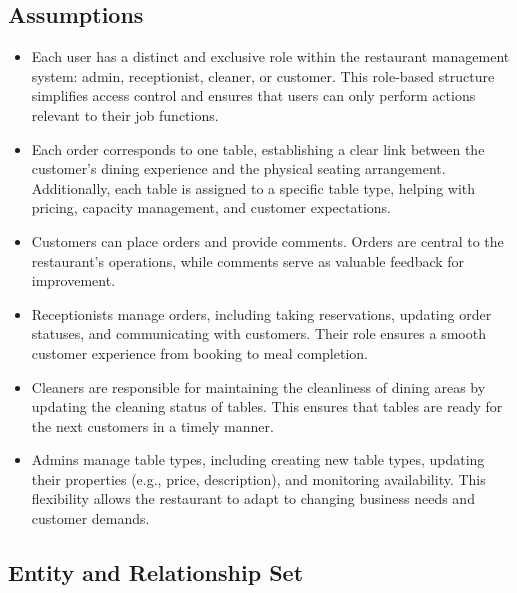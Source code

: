 \documentclass[12pt]{article}
\begin{document}
\subsection{Assumptions}
\begin{itemize}
    \item Each user has a distinct and exclusive role within the restaurant management system: admin, receptionist, cleaner, or customer. This role-based structure simplifies access control and ensures that users can only perform actions relevant to their job functions.
    \item Each order corresponds to one table, establishing a clear link between the customer's dining experience and the physical seating arrangement. Additionally, each table is assigned to a specific table type, helping with pricing, capacity management, and customer expectations.
    \item Customers can place orders and provide comments. Orders are central to the restaurant's operations, while comments serve as valuable feedback for improvement.
    \item Receptionists manage orders, including taking reservations, updating order statuses, and communicating with customers. Their role ensures a smooth customer experience from booking to meal completion.
    \item Cleaners are responsible for maintaining the cleanliness of dining areas by updating the cleaning status of tables. This ensures that tables are ready for the next customers in a timely manner.
    \item Admins manage table types, including creating new table types, updating their properties (e.g., price, description), and monitoring availability. This flexibility allows the restaurant to adapt to changing business needs and customer demands.
\end{itemize}

\subsection{Entity and Relationship Set}
\end{document}
